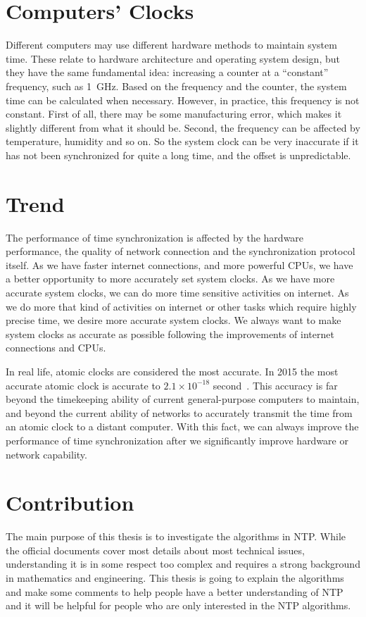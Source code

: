 \section{Computers' Clocks}
\label{sec:computers_clocks}
Different computers may use different hardware methods to maintain system time.
These relate to hardware architecture and operating system design, but they
have the same fundamental idea: increasing a counter at a ``constant''
frequency, such as 1~GHz. Based on the frequency and the counter, the system
time can be calculated when necessary. However, in practice, this frequency is
not constant.  First of all, there may be some manufacturing error, which makes
it slightly different from what it should be. Second, the frequency can be
affected by temperature, humidity and so on. So the system clock can be very
inaccurate if it has not been synchronized for quite a long time, and the
offset is unpredictable.

\section{Trend}
\label{sec:trend}
The performance of time synchronization is affected by the hardware
performance, the quality of network connection and the synchronization protocol
itself. 
As we have faster internet connections, and more powerful CPUs, we have a
better opportunity to more accurately set system clocks. As we have more
accurate system clocks, we can do more time sensitive activities on internet.
As we do more that kind of activities on internet or
other tasks which require highly precise time, we desire more accurate
system clocks.  We always want to make system clocks as accurate as possible
following the improvements of internet connections and CPUs. 

In real life, atomic clocks are considered the most accurate. In 2015 the most
accurate atomic clock is accurate to $2.1\times 10^{-18}$
second~\cite{atomic_clock}.
This accuracy is far beyond the timekeeping ability of current general-purpose
computers to maintain, and beyond the current ability of networks to accurately
transmit the time from an atomic clock to a distant computer. With this fact,
we can always improve the performance of time synchronization after we
significantly improve hardware or network capability.

\section{Contribution}
\label{sec:contribution}
The main purpose of this thesis is to investigate the algorithms in NTP\null.
While the official documents cover most details about most technical issues,
understanding it is in some respect too complex and requires a strong background
in mathematics and engineering. This thesis is going to explain the algorithms
and make some comments to help people have a better understanding of NTP and it
will be helpful for people who are only interested in the NTP algorithms.

